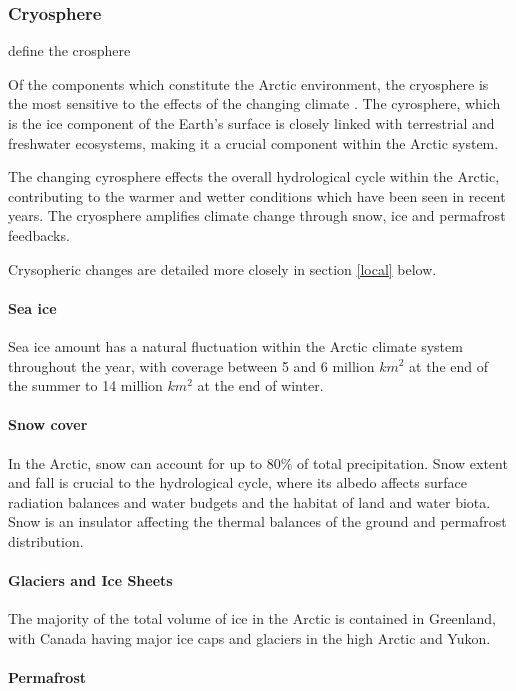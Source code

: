 \documentclass[11pt, oneside]{article}
\begin{document}
\subsubsection{Cryosphere}
define the crosphere 

Of the components which constitute the Arctic environment, the cryosphere is the most sensitive to the effects of the changing climate \cite{rinke2019trends}. The cyrosphere, which is the ice component of the Earth's surface is closely linked with terrestrial and freshwater ecosystems, making it a crucial component within the Arctic system.

The changing cyrosphere effects the overall hydrological cycle within the Arctic, contributing to the warmer and wetter conditions which have been seen in recent years. The cryosphere amplifies climate change through snow, ice and permafrost feedbacks. 

Crysopheric changes are detailed more closely in section \ref{local} below. 

\paragraph{Sea ice}
Sea ice amount has a natural fluctuation within the Arctic climate system throughout the year, with coverage between 5 and 6 million $km^2$ at the end of the summer to 14 million $km^2$ at the end of winter. 

\paragraph{Snow cover}
In the Arctic, snow can account for up to 80\% of total precipitation. Snow extent and fall is crucial to the hydrological cycle, where its albedo affects surface radiation balances and water budgets and the habitat of land and water biota. Snow is an insulator affecting the thermal balances of the ground and permafrost distribution. 


\paragraph{Glaciers and Ice Sheets}
The majority of the total volume of ice in the Arctic is contained in Greenland, with Canada having major ice caps and glaciers in the high Arctic and Yukon. 

\paragraph{Permafrost}\label{permafrost}
\end{document}
